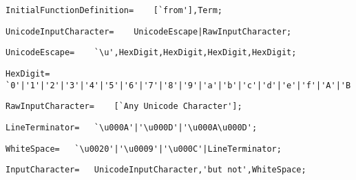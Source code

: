 \documentclass{article}
\begin{document}
    \begin{flushleft}
    \begin{lstlisting}[mathescape=true, breaklines=true]
      InitialFunctionDefinition= 	[`from'],Term;
    \end{lstlisting}
    \end{flushleft}
    \begin{flushleft}
    \begin{lstlisting}[mathescape=true, breaklines=true]
      UnicodeInputCharacter= 	UnicodeEscape|RawInputCharacter;
    \end{lstlisting}
    \end{flushleft}
    \begin{flushleft}
    \begin{lstlisting}[mathescape=true, breaklines=true]
      UnicodeEscape= 	`\u',HexDigit,HexDigit,HexDigit,HexDigit;
    \end{lstlisting}
    \end{flushleft}
    \begin{flushleft}
    \begin{lstlisting}[mathescape=true, breaklines=true]
      HexDigit= 	`0'|'1'|'2'|'3'|'4'|'5'|'6'|'7'|'8'|'9'|'a'|'b'|'c'|'d'|'e'|'f'|'A'|'B'|'C'|'D'|'E'|'F';
    \end{lstlisting}
    \end{flushleft}
    \begin{flushleft}
    \begin{lstlisting}[mathescape=true, breaklines=true]
      RawInputCharacter= 	[`Any Unicode Character'];
    \end{lstlisting}
    \end{flushleft}
    \begin{flushleft}
    \begin{lstlisting}[mathescape=true, breaklines=true]
      LineTerminator= 	`\u000A'|'\u000D'|'\u000A\u000D';
    \end{lstlisting}
    \end{flushleft}
    \begin{flushleft}
    \begin{lstlisting}[mathescape=true, breaklines=true]
      WhiteSpace= 	`\u0020'|'\u0009'|'\u000C'|LineTerminator;
    \end{lstlisting}
    \end{flushleft}
    \begin{flushleft}
    \begin{lstlisting}[mathescape=true, breaklines=true]
      InputCharacter= 	UnicodeInputCharacter,'but not',WhiteSpace;
    \end{lstlisting}
    \end{flushleft}
\end{document}
